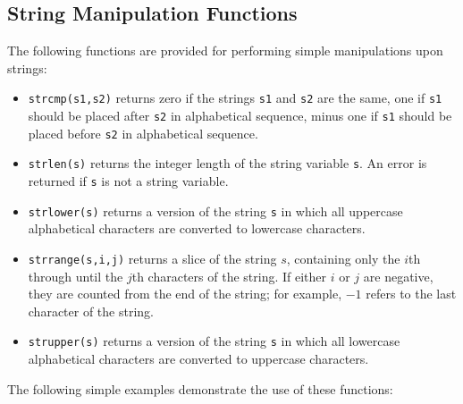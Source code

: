 \subsection{String Manipulation Functions}

The following functions are provided for performing simple manipulations upon
strings:

\noindent
\begin{itemize}
\item {\tt strcmp(s1,s2)} returns zero if the strings {\tt s1} and {\tt s2} are the same, one if {\tt s1} should be placed after {\tt s2} in alphabetical sequence, minus one if {\tt s1} should be placed before {\tt s2} in alphabetical sequence.
\item {\tt strlen(s)} returns the integer length of the string variable {\tt s}. An error is returned if {\tt s} is not a string variable.
\item {\tt strlower(s)} returns a version of the string {\tt s} in which all uppercase alphabetical characters are converted to lowercase characters.
\item {\tt strrange(s,i,j)} returns a slice of the string $s$, containing only the $i$th through until the $j$th characters of the string. If either $i$ or $j$ are negative, they are counted from the end of the string; for example, $-1$ refers to the last character of the string.
\item {\tt strupper(s)} returns a version of the string {\tt s} in which all lowercase alphabetical characters are converted to uppercase characters.
\end{itemize}

\noindent
The following simple examples demonstrate the use of these functions:

\vspace{3mm}
\newline
{}\newline
{}\newline
{}\newline
{}\newline
{}\newline
{}\newline
{}\newline
{}
\vspace{3mm}

